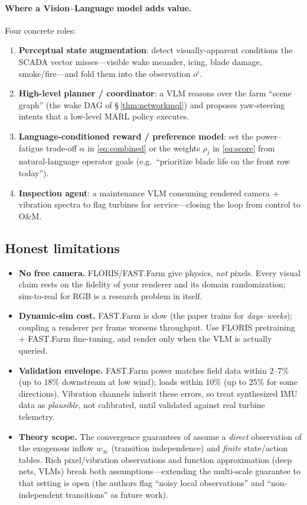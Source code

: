 \documentclass[11pt]{article}
\theoremstyle{plain}
\theoremstyle{definition}
\begin{document}
\paragraph{Where a Vision--Language model adds value.} Four concrete roles:
\begin{enumerate}[leftmargin=1.5em,itemsep=1pt]
  \item \textbf{Perceptual state augmentation}: detect visually-apparent
  conditions the SCADA vector misses---visible wake meander, icing, blade
  damage, smoke/fire---and fold them into the observation $o^i$.
  \item \textbf{High-level planner / coordinator}: a VLM reasons over the farm
  ``scene graph'' (the wake DAG of \S\,\ref{thm:networkmql}) and proposes
  yaw-steering intents that a low-level MARL policy executes.
  \item \textbf{Language-conditioned reward / preference model}: set the
  power--fatigue trade-off $\alpha$ in \eqref{eq:combined} or the weights
  $\rho_j$ in \eqref{eq:score} from natural-language operator goals (e.g.\
  ``prioritize blade life on the front row today'').
  \item \textbf{Inspection agent}: a maintenance VLM consuming rendered
  camera + vibration spectra to flag turbines for service---closing the loop
  from control to O\&M.
\end{enumerate}

\subsection{Honest limitations}

\begin{itemize}[leftmargin=1.4em,itemsep=1pt]
  \item \textbf{No free camera.} FLORIS/FAST.Farm give physics, \emph{not}
  pixels. Every visual claim rests on the fidelity of your renderer and its
  domain randomization; sim-to-real for RGB is a research problem in itself.
  \item \textbf{Dynamic-sim cost.} FAST.Farm is slow (the paper trains for
  \emph{days--weeks}); coupling a renderer per frame worsens throughput. Use
  FLORIS pretraining + FAST.Farm fine-tuning, and render only when the VLM is
  actually queried.
  \item \textbf{Validation envelope.} FAST.Farm power matches field data within
  $2$--$7\%$ (up to $18\%$ downstream at low wind); loads within $10\%$
  (up to $25\%$ for some directions). Vibration channels inherit these errors,
  so treat synthesized IMU data as \emph{plausible}, not calibrated, until
  validated against real turbine telemetry.
  \item \textbf{Theory scope.} The convergence guarantees of \cite{P2} assume
  a \emph{direct} observation of the exogenous inflow $w_\infty$ (transition
  independence) and \emph{finite} state/action tables. Rich pixel/vibration
  observations and function approximation (deep nets, VLMs) break both
  assumptions---extending the multi-scale guarantee to that setting is open
  (the authors flag ``noisy local observations'' and ``non-independent
  transitions'' as future work).
\end{itemize}
\end{document}
